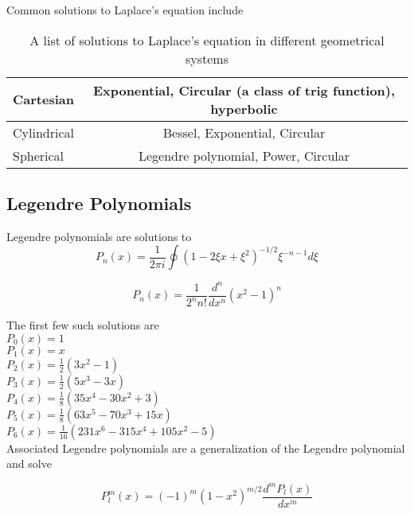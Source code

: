 \documentclass{article}
\numberwithin{equation}{subsection}
\begin{document}
Common solutions to Laplace's equation include

\begin{table}
\begin{center}
\label{tbl_laplace_solutions}
\caption{A list of solutions to Laplace's equation in different geometrical systems}
\begin{tabular}{|l|c|}
\hline
Cartesian & Exponential, Circular (a class of trig function), hyperbolic \\ \hline
Cylindrical & Bessel, Exponential, Circular \\ \hline
Spherical & Legendre polynomial, Power, Circular \\ \hline
\end{tabular}
\end{center}
\end{table}

\subsection{Legendre Polynomials} \label{sec_legendre}

Legendre polynomials are solutions to
\begin{equation}
P_n(x) = \frac{1}{2 \pi i} \oint (1-2\xi x + \xi^2)^{-1/2} \xi^{-n-1} d\xi
\end{equation}

\begin{equation}
P_n(x) = \frac{1}{2^n n!}\frac{d^n}{dx^n}(x^2-1)^n
\end{equation}

The first few such solutions are \\
$P_0(x) = 1$ \\
$P_1(x) = x$ \\
$P_2(x) = \frac{1}{2}(3x^2-1)$ \\
$P_3(x) = \frac{1}{2}(5x^3 - 3x)$ \\
$P_4(x) = \frac{1}{8}(35x^4 - 30x^2 + 3)$ \\
$P_5(x) = \frac{1}{8}(63x^5 - 70x^3 + 15x)$ \\
$P_6(x) = \frac{1}{16}(231x^6 - 315x^4 + 105x^2 - 5)$ \\

Associated Legendre polynomials are a generalization of the Legendre polynomial and solve 

\begin{equation}
P_l^m(x) = (-1)^m(1-x^2)^{m/2}\frac{d^m P_l(x)}{dx^m}
\end{equation}
\end{document}
